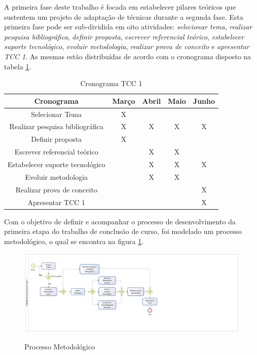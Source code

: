 A primeira fase deste trabalho é focada em estabelecer pilares teóricos que sustentem um projeto de adaptação de técnicas durante a segunda fase. Esta primeira fase pode ser sub-dividida em oito atividades: \textit{selecionar tema}, \textit{realizar pesquisa bibliográfica}, \textit{definir proposta}, \textit{escrever referencial teórico}, \textit{estabelecer suporte tecnológico}, \textit{evoluir metodologia}, \textit{realizar prova de conceito} e \textit{apresentar TCC 1}. As mesmas estão distribuídas de acordo com o cronograma disposto na tabela \ref{tab:cronograma}.

\begin{table}[H]
	\centering
	\begin{tabular}{|c|c|c|c|c|}
		\hline
		\textbf{Cronograma}             & \textbf{Março} & \textbf{Abril} & \textbf{Maio} & \textbf{Junho} \\ \hline
		Selecionar Tema                 & X              &                &               &                \\ \hline
		Realizar pesquisa bibliográfica & X              & X              & X             & X              \\ \hline
		Definir proposta                & X              &                &               &                \\ \hline
		Escrever referencial teórico    &                & X              & X             &                \\ \hline
		Estabelecer suporte tecnológico &                & X              & X             & X              \\ \hline
		Evoluir metodologia             &                & X              & X             &                \\ \hline
		Realizar prova de conceito      &                &                &               & X              \\ \hline
		Apresentar TCC 1                &                &                &               & X              \\ \hline
	\end{tabular}
	\caption{Cronograma TCC 1}
	\label{tab:cronograma}
\end{table}

Com o objetivo de definir e acompanhar o processo de desenvolvimento da primeira etapa do trabalho de conclusão de curso, foi modelado um processo metodológico, o qual se encontra na figura \ref{img:processo}.

\begin{figure}[H]
	\centering
	\caption{Processo Metodológico}
	\includegraphics[scale=0.6]{figuras/processo.eps}
	\label{img:processo}
\end{figure}

